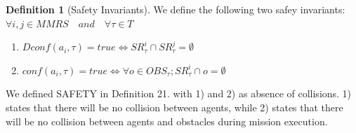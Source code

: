 \documentclass[journal]{IEEEtran}
\theoremstyle{definition}
\newtheorem{definition}{Definition}
\begin{document}



\begin{definition}[Safety Invariants]
We define the following two safey invariants: $ \forall i,j \in MMRS  \quad and \quad \forall \tau \in T$ 
\begin{enumerate}
\item $ Dconf(a_i, \tau)=true \iff SR_\tau^i \cap SR_\tau^j  = \emptyset        $  
\item $  conf(a_i, \tau)=true  \iff  \forall o \in OBS_\tau;
SR_\tau^i \cap o = \emptyset $ \\
\end{enumerate}
\end{definition}







We defined SAFETY in Definition 21. with 1) and 2) as  absence of collisions. 
1) states that there will be no collision between agents, 
while 2) states that there will be no collision between agents and obstacles during mission execution. 



\end{document}
